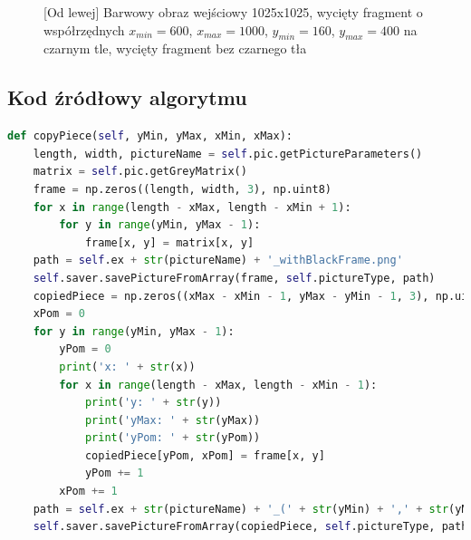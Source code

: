 \documentclass[a4paper,12pt, titlepage]{report}
\begin{document}
\begin{figure}[h]
    \centering
    \caption{[Od lewej] Barwowy obraz wejściowy 1025x1025, wycięty fragment o współrzędnych \(x_{min}=600\), \(x_{max}=1000\), \(y_{min}=160\), \(y_{max}=400\) na czarnym tle, wycięty fragment bez czarnego tła}%
    \label{fig:geo_after_grey1}%
\end{figure}
\FloatBarrier
\subsection*{Kod źródłowy algorytmu}
\begin{lstlisting}[language=Python]
def copyPiece(self, yMin, yMax, xMin, xMax):
    length, width, pictureName = self.pic.getPictureParameters()
    matrix = self.pic.getGreyMatrix()
    frame = np.zeros((length, width, 3), np.uint8)
    for x in range(length - xMax, length - xMin + 1):
        for y in range(yMin, yMax - 1):
            frame[x, y] = matrix[x, y]
    path = self.ex + str(pictureName) + '_withBlackFrame.png'
    self.saver.savePictureFromArray(frame, self.pictureType, path)
    copiedPiece = np.zeros((xMax - xMin - 1, yMax - yMin - 1, 3), np.uint8)
    xPom = 0
    for y in range(yMin, yMax - 1):
        yPom = 0
        print('x: ' + str(x))
        for x in range(length - xMax, length - xMin - 1):
            print('y: ' + str(y))
            print('yMax: ' + str(yMax))
            print('yPom: ' + str(yPom))
            copiedPiece[yPom, xPom] = frame[x, y]
            yPom += 1
        xPom += 1
    path = self.ex + str(pictureName) + '_(' + str(yMin) + ',' + str(yMax) + '),(' + str(xMin) + ',' + str(xMax) + ').png'
    self.saver.savePictureFromArray(copiedPiece, self.pictureType, path)
\end{lstlisting}
\end{document}
